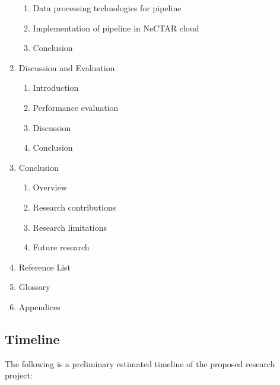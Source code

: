 \documentclass[a4paper,11pt]{article}
\begin{document}
\begin{enumerate}
\begin{enumerate}[label*=\arabic*.]
    \item Data processing technologies for pipeline
    \item Implementation of pipeline in NeCTAR cloud
    \item Conclusion
  \end{enumerate}
  \item Discussion and Evaluation
  \begin{enumerate}[label*=\arabic*.]
    \item Introduction
    \item Performance evaluation
    \item Discussion
    \item Conclusion
  \end{enumerate}
  \item Conclusion
  \begin{enumerate}[label*=\arabic*.]
    \item Overview
    \item Research contributions
    \item Research limitations
    \item Future research
  \end{enumerate}
  \item Reference List
  \item Glossary
  \item Appendices
\end{enumerate}


\subsection{Timeline} %
\label{sub:timeline}

The following is a preliminary estimated timeline of the proposed research project:
\end{document}

